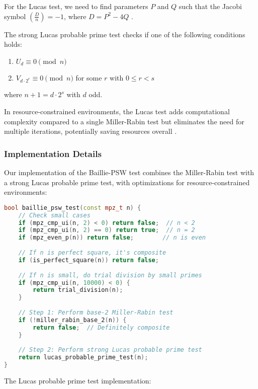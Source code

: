 For the Lucas test, we need to find parameters $P$ and $Q$ such that the Jacobi symbol $\left( \frac{D}{n} \right) = -1$, where $D = P^2 - 4Q$ \cite{lucas1878}.

The strong Lucas probable prime test checks if one of the following conditions holds:
\begin{enumerate}
    \item $U_d \equiv 0 \pmod{n}$
    \item $V_{d \cdot 2^r} \equiv 0 \pmod{n}$ for some $r$ with $0 \leq r < s$
\end{enumerate}
where $n + 1 = d \cdot 2^s$ with $d$ odd.

In resource-constrained environments, the Lucas test adds computational complexity compared to a single Miller-Rabin test but eliminates the need for multiple iterations, potentially saving resources overall \cite{hardware_baillie, taxonomy_primality}.

\subsubsection{Implementation Details}

Our implementation of the Baillie-PSW test combines the Miller-Rabin test with a strong Lucas probable prime test, with optimizations for resource-constrained environments:

\begin{lstlisting}[language=C++, caption=Baillie-PSW Test Implementation]
bool baillie_psw_test(const mpz_t n) {
    // Check small cases
    if (mpz_cmp_ui(n, 2) < 0) return false;  // n < 2
    if (mpz_cmp_ui(n, 2) == 0) return true;  // n = 2
    if (mpz_even_p(n)) return false;        // n is even
    
    // If n is perfect square, it's composite
    if (is_perfect_square(n)) return false;
    
    // If n is small, do trial division by small primes
    if (mpz_cmp_ui(n, 10000) < 0) {
        return trial_division(n);
    }
    
    // Step 1: Perform base-2 Miller-Rabin test
    if (!miller_rabin_base_2(n)) {
        return false;  // Definitely composite
    }
    
    // Step 2: Perform strong Lucas probable prime test
    return lucas_probable_prime_test(n);
}
\end{lstlisting}

The Lucas probable prime test implementation:

